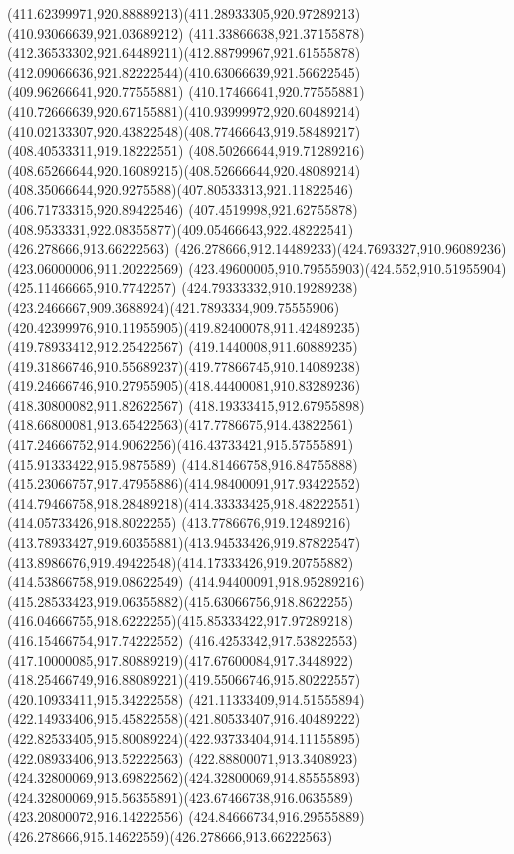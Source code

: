 {{		\curveto(411.62399971,920.88889213)(411.28933305,920.97289213)(410.93066639,921.03689212)
		\curveto(411.33866638,921.37155878)(412.36533302,921.64489211)(412.88799967,921.61555878)
		\curveto(412.09066636,921.82222544)(410.63066639,921.56622545)(409.96266641,920.77555881)
		\curveto(410.17466641,920.77555881)(410.72666639,920.67155881)(410.93999972,920.60489214)
		\curveto(410.02133307,920.43822548)(408.77466643,919.58489217)(408.40533311,919.18222551)
		\curveto(408.50266644,919.71289216)(408.65266644,920.16089215)(408.52666644,920.48089214)
		\curveto(408.35066644,920.9275588)(407.80533313,921.11822546)(406.71733315,920.89422546)
		\curveto(407.4519998,921.62755878)(408.9533331,922.08355877)(409.05466643,922.48222541)
		\moveto(426.278666,913.66222563)
		\curveto(426.278666,912.14489233)(424.7693327,910.96089236)(423.06000006,911.20222569)
		\curveto(423.49600005,910.79555903)(424.552,910.51955904)(425.11466665,910.7742257)
		\curveto(424.79333332,910.19289238)(423.2466667,909.3688924)(421.7893334,909.75555906)
		\curveto(420.42399976,910.11955905)(419.82400078,911.42489235)(419.78933412,912.25422567)
		\curveto(419.1440008,911.60889235)(419.31866746,910.55689237)(419.77866745,910.14089238)
		\curveto(419.24666746,910.27955905)(418.44400081,910.83289236)(418.30800082,911.82622567)
		\curveto(418.19333415,912.67955898)(418.66800081,913.65422563)(417.7786675,914.43822561)
		\curveto(417.24666752,914.9062256)(416.43733421,915.57555891)(415.91333422,915.9875589)
		\curveto(414.81466758,916.84755888)(415.23066757,917.47955886)(414.98400091,917.93422552)
		\curveto(414.79466758,918.28489218)(414.33333425,918.48222551)(414.05733426,918.8022255)
		\curveto(413.7786676,919.12489216)(413.78933427,919.60355881)(413.94533426,919.87822547)
		\curveto(413.8986676,919.49422548)(414.17333426,919.20755882)(414.53866758,919.08622549)
		\curveto(414.94400091,918.95289216)(415.28533423,919.06355882)(415.63066756,918.8622255)
		\curveto(416.04666755,918.6222255)(415.85333422,917.97289218)(416.15466754,917.74222552)
		\curveto(416.4253342,917.53822553)(417.10000085,917.80889219)(417.67600084,917.3448922)
		\curveto(418.25466749,916.88089221)(419.55066746,915.80222557)(420.10933411,915.34222558)
		\curveto(421.11333409,914.51555894)(422.14933406,915.45822558)(421.80533407,916.40489222)
		\curveto(422.82533405,915.80089224)(422.93733404,914.11155895)(422.08933406,913.52222563)
		\curveto(422.88800071,913.3408923)(424.32800069,913.69822562)(424.32800069,914.85555893)
		\curveto(424.32800069,915.56355891)(423.67466738,916.0635589)(423.20800072,916.14222556)
		\curveto(424.84666734,916.29555889)(426.278666,915.14622559)(426.278666,913.66222563)
	}
}